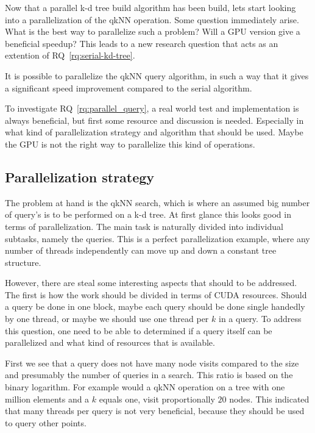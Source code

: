 





Now that a parallel k-d tree build algorithm has been build, lets start looking into a parallelization of the qkNN operation. Some question immediately arise. What is the best way to parallelize such a problem? Will a GPU version give a beneficial speedup? This leads to a new research question that acts as an extention of RQ~\ref{rq:serial-kd-tree}.


\begin{myrq}
\label{rq:parallel_query}
    It is possible to parallelize the qkNN query algorithm, in such a way that it gives a significant speed improvement compared to the serial algorithm.
\end{myrq}


To investigate RQ~\ref{rq:parallel_query}, a real world test and implementation is always beneficial, but first some resource and discussion is needed. Especially in what kind of parallelization strategy and algorithm that should be used. Maybe the GPU is not the right way to parallelize this kind of operations.


\subsection{Parallelization strategy} %
\label{sub:parallelization_strategy}


The problem at hand is the qkNN search, which is where an assumed big number of query's is to be performed on a k-d tree. At first glance this looks good in terms of parallelization. The main task is naturally divided into individual subtasks, namely the queries. This is a perfect parallelization example, where any number of threads independently can move up and down a constant tree structure.

However, there are steal some interesting aspects that should to be addressed. The first is how the work should be divided in terms of CUDA resources. Should a query be done in one block, maybe each query should be done single handedly by one thread, or maybe we should use one thread per $k$ in a query. To address this question, one need to be able to determined if a query itself can be parallelized and what kind of resources that is available.

First we see that a query does not have many node visits compared to the size and presumably the number of queries in a search. This ratio is based on the binary logarithm. For example would a qkNN operation on a tree with one million elements and a $k$ equals one, visit proportionally $20$ nodes. This indicated that many threads per query is not very beneficial, because they should be used to query other points. 

